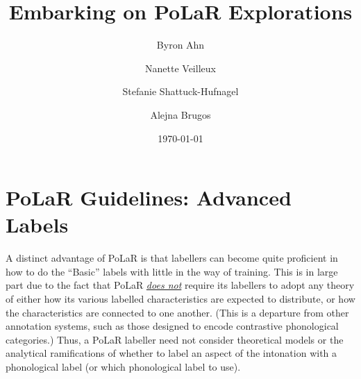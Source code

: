 \documentclass[11pt, twoside]{memoir}
\def\THIStitle{Embarking on PoLaR Explorations}
\def\THISsubtitle{A Framework for Intonational Annotation and Analysis}
\begin{document}
\frontmatter
{}

\title{\THIStitle}
\author{Byron Ahn \and Nanette Veilleux \and Stefanie Shattuck-Hufnagel \and Alejna Brugos}
\date{\today}


\tableofcontents
\newpage
\listoffigures
\listoftables
\newpage

\mainmatter

\chapter{PoLaR Guidelines: Advanced Labels}\label{ch:advanced}

A distinct advantage of PoLaR is that labellers can become quite proficient in how to do the “Basic” labels with little in the way of training. This is in large part due to the fact that PoLaR \textit{\uline{does not}} require its labellers to adopt any theory of either how its various labelled characteristics are expected to distribute, or how the characteristics are connected to one another. (This is a departure from other annotation systems, such as those designed to encode contrastive phonological categories.) Thus, a PoLaR labeller need not consider theoretical models or the analytical ramifications of whether to label an aspect of the intonation with a phonological label (or which phonological label to use).
\end{document}
